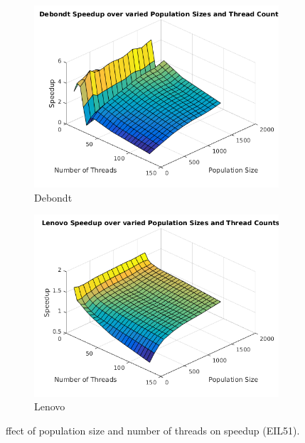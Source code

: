 \documentclass[10pt,letterpaper]{article}
\begin{document}
\begin{figure}[t]
\centering
   \begin{subfigure}{0.49\linewidth} \centering
	\includegraphics[width=\textwidth]{../img/Debondt_PopulationvsThreads.png} 
     \caption{Debondt}\label{fig:figA}
   \end{subfigure}
   \begin{subfigure}{0.49\linewidth} \centering
	\includegraphics[width=\textwidth]{../img/Lenovo_PopulationvsThreads.png}         
     \caption{Lenovo}\label{fig:figB}
   \end{subfigure}
\caption{ffect of population size and number of threads on speedup (EIL51).} \label{fig:popvsthreads}
\end{figure}
\end{document}
